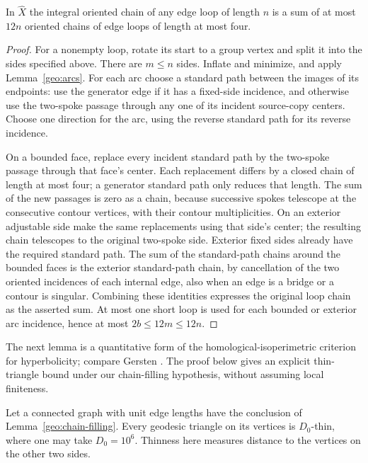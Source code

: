 \begin{lemma}
\label{geo:chain-filling}
In $\widehat X$ the integral oriented chain of any edge loop of length $n$
is a sum of at most $12n$ oriented chains of edge loops of length at most
four.
\end{lemma}

\begin{proof}
For a nonempty loop, rotate its start to a group vertex and split it into
the sides specified above.  There are $m\le n$ sides.  Inflate and minimize,
and apply Lemma~\ref{geo:arcs}.  For each arc choose a standard path between
the images of its endpoints: use the generator edge if it has a fixed-side
incidence, and otherwise use the two-spoke passage through any one of its
incident source-copy centers.  Choose one direction for the arc, using the
reverse standard path for its reverse incidence.

On a bounded face, replace every incident standard path by the two-spoke
passage through that face's center.  Each replacement differs by a closed
chain of length at most four; a generator standard path only reduces that
length.  The sum of the new passages is zero as a chain, because successive
spokes telescope at the consecutive contour vertices, with their contour
multiplicities.  On an exterior adjustable side make the same replacements
using that side's center; the resulting chain telescopes to the original
two-spoke side.  Exterior fixed sides already have the required standard
path.  The sum of the standard-path chains around the bounded faces is
the exterior standard-path chain, by cancellation of the two oriented
incidences of each internal edge, also when an edge is a bridge or a
contour is singular.  Combining these identities expresses the original
loop chain as the asserted sum.  At most one short loop is used for each
bounded or exterior arc incidence, hence at most $2b\le12m\le12n$.
\end{proof}

The next lemma is a quantitative form of the homological-isoperimetric
criterion for hyperbolicity; compare Gersten
\cite[Theorem~6.3]{Gersten1996}.  The proof below gives an explicit
thin-triangle bound under our chain-filling hypothesis, without assuming
local finiteness.

\begin{lemma}
\label{geo:thin}
Let a connected graph with unit edge lengths have the conclusion of
Lemma~\ref{geo:chain-filling}.  Every geodesic triangle on its vertices is
$D_0$-thin, where one may take $D_0=10^6$.  Thinness here measures distance
to the vertices on the other two sides.
\end{lemma}

